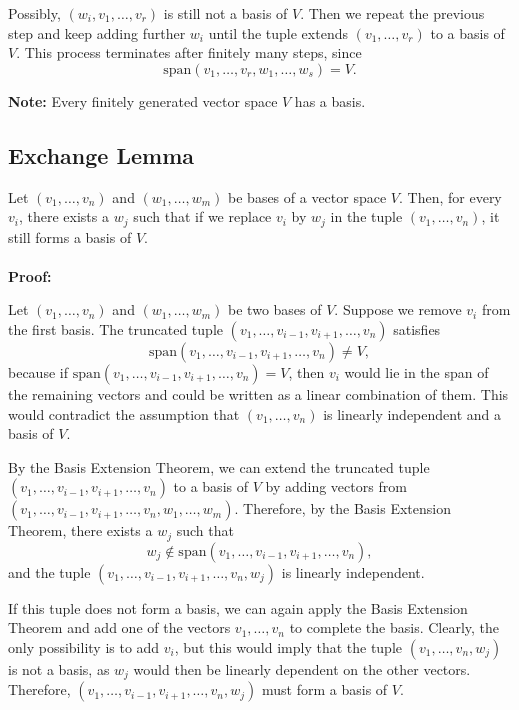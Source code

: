 Possibly, \((w_i, v_1, \ldots, v_r)\) is still not a basis of \(V\). Then we repeat the previous step and keep adding further \(w_i\) until the tuple extends \((v_1, \ldots, v_r)\) to a basis of \(V\). This process terminates after finitely many steps, since
\[
\text{span}(v_1, \ldots, v_r, w_1, \ldots, w_s) = V.
\]
\QED

\textbf{Note:} Every finitely generated vector space \(V\) has a basis.

\subsection{Exchange Lemma}

Let \((v_1, \ldots, v_n)\) and \((w_1, \ldots, w_m)\) be bases of a vector space \(V\). Then, for every \(v_i\), there exists a \(w_j\) such that if we replace \(v_i\) by \(w_j\) in the tuple \((v_1, \ldots, v_n)\), it still forms a basis of \(V\).
\\\\
\textbf{Proof:}

Let \((v_1, \ldots, v_n)\) and \((w_1, \ldots, w_m)\) be two bases of \(V\). Suppose we remove \(v_i\) from the first basis. The truncated tuple \((v_1, \ldots, v_{i-1}, v_{i+1}, \ldots, v_n)\) satisfies
\[
\text{span}(v_1, \ldots, v_{i-1}, v_{i+1}, \ldots, v_n) \neq V,
\]
because if \(\text{span}(v_1, \ldots, v_{i-1}, v_{i+1}, \ldots, v_n) = V\), then \(v_i\) would lie in the span of the remaining vectors and could be written as a linear combination of them. This would contradict the assumption that \((v_1, \ldots, v_n)\) is linearly independent and a basis of \(V\).

By the Basis Extension Theorem, we can extend the truncated tuple \((v_1, \ldots, v_{i-1}, v_{i+1}, \ldots, v_n)\) to a basis of \(V\) by adding vectors from \((v_1, \ldots, v_{i-1}, v_{i+1}, \ldots, v_n, w_1, \ldots, w_m)\). Therefore, by the Basis Extension Theorem, there exists a \(w_j\) such that
\[
w_j \notin \text{span}(v_1, \ldots, v_{i-1}, v_{i+1}, \ldots, v_n),
\]
and the tuple \((v_1, \ldots, v_{i-1}, v_{i+1}, \ldots, v_n, w_j)\) is linearly independent.

If this tuple does not form a basis, we can again apply the Basis Extension Theorem and add one of the vectors \(v_1, \ldots, v_n\) to complete the basis. Clearly, the only possibility is to add \(v_i\), but this would imply that the tuple \((v_1, \ldots, v_n, w_j)\) is not a basis, as \(w_j\) would then be linearly dependent on the other vectors. Therefore, \((v_1, \ldots, v_{i-1}, v_{i+1}, \ldots, v_n, w_j)\) must form a basis of \(V\).

